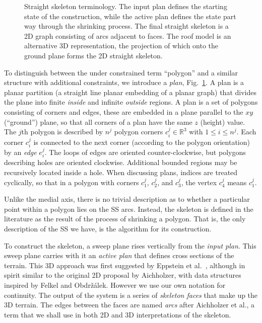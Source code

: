 \begin{figure}[hb]
  \centering
  \def\svgwidth{1.0\columnwidth}
  
  \caption[Straight skeleton terminology]{\label{fig:skel_terms}Straight skeleton terminology. The input plan defines the starting state of the construction, while the active plan defines the state part way through the shrinking process. The final straight skeleton is a 2D graph consisting of arcs adjacent to faces. The roof model is an alternative 3D representation, the projection of which onto the ground plane forms the 2D straight skeleton.}
\end{figure}

To distinguish between the under constrained term ``polygon'' and a similar structure with additional constraints, we introduce a \emph{plan}, Fig.~\ref{fig:skel_terms}. A plan is a  planar partition (a straight line planar embedding of a planar graph) that divides the plane into finite \emph{inside} and infinite \emph{outside} regions. 
A plan is a set of polygons consisting of corners and edges, these are embedded in a plane parallel to the $xy$ (``ground'') plane, so that all corners of a plan have the same $z$ (height) value. The $j$th polygon is described by $n^j$ polygon corners $c^j_i \in \mathbb{R}^3$ with $1 \leq i \leq n^j$.  Each corner $c^j_i$ is connected to the next corner (according to the polygon orientation) by an \emph{edge} $e^j_i$. 
The loops of edges are oriented counter-clockwise, but polygons describing holes are oriented clockwise. 
Additional bounded regions may be recursively located inside a hole. 
When discussing plans, indices are treated cyclically, so that in a polygon with corners $c^j_1$, $c^j_2$, and $c^j_3$, the vertex $c^j_4$ means $c^j_1$.

Unlike the medial axis, there is no trivial description as to whether a particular point within a polygon lies on the SS arcs. Instead, the skeleton is defined in the literature as the result of the process of shrinking a polygon. That is, the only description of the SS we have, is the algorithm for its construction.

To construct the skeleton, a sweep plane rises vertically from the \emph{input plan}. This sweep plane carries with it an \emph{active plan} that defines cross sections of the terrain. This 3D approach was first suggested by Eppstein et al.~\cite{Epp:98}, although in spirit similar to the original 2D proposal by Aichholzer\cite{Aichholzer95}, with data structures inspired by Felkel and Obdr\v{z}{\'a}lek\cite{Felkel98}. However we use our own notation for continuity. The output of the system is a series of \emph{skeleton faces} that make up the 3D terrain. The edges between the faces are named \emph{arcs} after Aichholzer et al.\cite{Aichholzer95}, a term that we shall use in both 2D and 3D interpretations of the skeleton.

